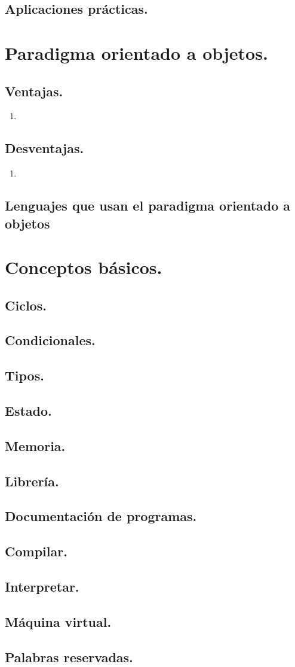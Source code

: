 \documentclass{book} %
\begin{document}
\section{Aplicaciones prácticas.}

\chapter{Paradigma orientado a objetos.}
\section{Ventajas.}
\begin{enumerate}
	\item
\end{enumerate}
\section{Desventajas.}
\begin{enumerate}
	\item
\end{enumerate}

\section{Lenguajes que usan el paradigma orientado a objetos}

\chapter{Conceptos básicos.}
\section{Ciclos.}
\section{Condicionales.}
\section{Tipos.}
\section{Estado.}
\section{Memoria.}
\section{Librería.}
\section{Documentación de programas.}
\section{Compilar.}
\section{Interpretar.}
\section{Máquina virtual.}
\section{Palabras reservadas.}
\end{document}
